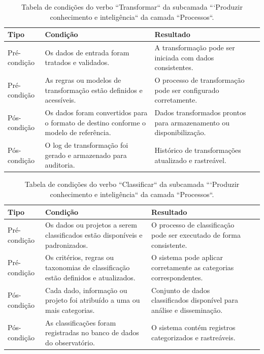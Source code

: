 \begin{apendicesenv}
\begin{table}[H]
\centering
\caption{Tabela de condições do verbo ``Transformar`` da subcamada ```Produzir conhecimento e inteligência`` da camada ``Processos``.}
\begin{tabularx}{\textwidth}{|l|X|X|X|}
\hline
\textbf{Tipo} & \textbf{Condição} & \textbf{Resultado} \\ \hline
Pré-condição & Os dados de entrada foram tratados e validados. & A transformação pode ser iniciada com dados consistentes.\\ \hline
Pré-condição & As regras ou modelos de transformação estão definidos e acessíveis. & O processo de transformação pode ser configurado corretamente.\\ \hline
Pós-condição & Os dados foram convertidos para o formato de destino conforme o modelo de referência. & Dados transformados prontos para armazenamento ou disponibilização.\\ \hline
Pós-condição & O log de transformação foi gerado e armazenado para auditoria. & Histórico de transformações atualizado e rastreável.\\ \hline
\end{tabularx}
\end{table}

\begin{table}[H]
\centering
\caption{Tabela de condições do verbo ``Classificar`` da subcamada ```Produzir conhecimento e inteligência`` da camada ``Processos``.}
\begin{tabularx}{\textwidth}{|l|X|X|X|}
\hline
\textbf{Tipo} & \textbf{Condição} & \textbf{Resultado} \\ \hline
Pré-condição & Os dados ou projetos a serem classificados estão disponíveis e padronizados. & O processo de classificação pode ser executado de forma consistente.\\ \hline
Pré-condição & Os critérios, regras ou taxonomias de classificação estão definidos e atualizados. & O sistema pode aplicar corretamente as categorias correspondentes.\\ \hline
Pós-condição & Cada dado, informação ou projeto foi atribuído a uma ou mais categorias. & Conjunto de dados classificados disponível para análise e disseminação.\\ \hline
Pós-condição & As classificações foram registradas no banco de dados do observatório. & O sistema contém registros categorizados e rastreáveis.\\ \hline
\end{tabularx}
\end{table}


\end{apendicesenv}
